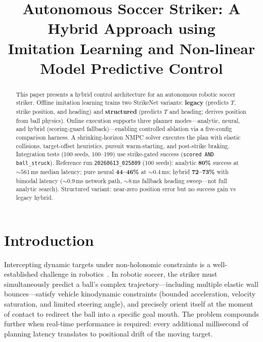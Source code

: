 \documentclass[10pt,twocolumn,letterpaper]{article}
\begin{document}
\title{Autonomous Soccer Striker: A Hybrid Approach using\\Imitation Learning and Non-linear Model Predictive Control}

\author{
}

\maketitle

\begin{abstract}
This paper presents a hybrid control architecture for an autonomous
robotic soccer striker. Offline imitation learning trains two StrikeNet
variants: \textbf{legacy} (predicts $T$, strike position, and heading) and
\textbf{structured} (predicts $T$ and heading; derives position from ball
physics). Online execution supports three planner modes---analytic,
neural, and hybrid (scoring-guard fallback)---enabling controlled ablation
via a five-config comparison harness. A shrinking-horizon NMPC solver
executes the plan with elastic collisions, target-offset heuristics,
pursuit warm-starting, and post-strike braking. Integration tests (100
seeds, 100--199) use strike-gated success (\texttt{scored AND
ball\_struck}). Reference run \texttt{20260613\_025809} (100 seeds):
analytic \textbf{80\%} success at ${\sim}561$\,ms median latency; pure neural
\textbf{44--46\%} at ${\sim}0.4$\,ms; hybrid \textbf{72--73\%} with bimodal
latency (${\sim}0.9$\,ms network path, ${\sim}8$\,ms fallback heading sweep---not
full analytic search). Structured variant: near-zero position error but no
success gain vs legacy hybrid.
\end{abstract}

\section{Introduction}

Intercepting dynamic targets under non-holonomic constraints is a
well-established challenge in robotics~\cite{lavalle2006planning}. In
robotic soccer, the striker must simultaneously predict a ball's
complex trajectory---including multiple elastic wall bounces---satisfy
vehicle kinodynamic constraints (bounded acceleration, velocity
saturation, and limited steering angle), and precisely orient itself at
the moment of contact to redirect the ball into a specific goal mouth.
The problem compounds further when real-time performance is required:
every additional millisecond of planning latency translates to
positional drift of the moving target.
\end{document}
